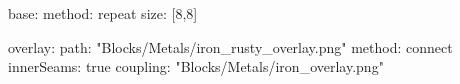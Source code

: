 base:
  method: repeat
  size: [8,8]
  
overlay:
  path: "Blocks/Metals/iron_rusty_overlay.png"
  method: connect
  innerSeams: true
  coupling: "Blocks/Metals/iron_overlay.png"